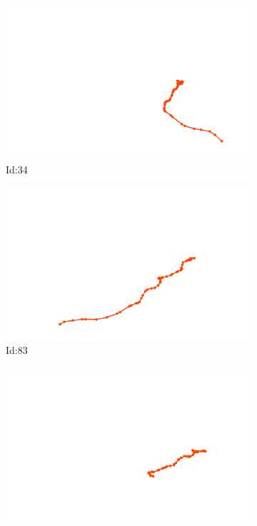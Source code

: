 \documentclass[12pt,twoside]{report}
\begin{document}
\begin{figure}
\centering
\begin{subfigure}[b]{0.20\textwidth}
\centering
\includegraphics[width=\textwidth]{../trajectories/34.png}
\caption{Id:34}
\end{subfigure}
\begin{subfigure}[b]{0.20\textwidth}
\centering
\includegraphics[width=\textwidth]{../trajectories/83.png}
\caption{Id:83}
\end{subfigure}
\begin{subfigure}[b]{0.20\textwidth}
\centering
\includegraphics[width=\textwidth]{../trajectories/90.png}

\end{subfigure}
\end{figure}
\end{document}
